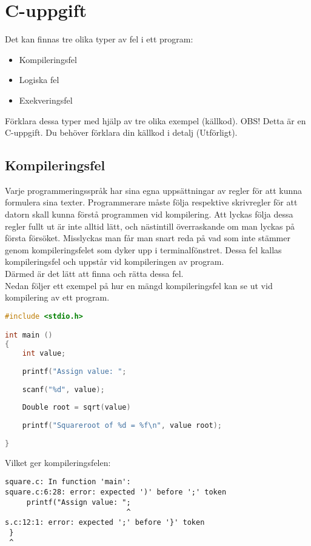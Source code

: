 \documentclass[../main.tex]{subfiles}
\begin{document}
\section{C-uppgift}
\label{sec:top}
Det kan finnas tre olika typer av fel i ett program:

\begin{itemize}
    \item Kompileringsfel
    \item Logiska fel
    \item Exekveringsfel
\end{itemize}

Förklara dessa typer med hjälp av tre olika exempel (källkod).
OBS! Detta är en C-uppgift. Du behöver förklara din källkod i detalj (Utförligt).

\subsection{Kompileringsfel}

Varje programmeringsspråk har sina egna uppsättningar av regler för att kunna formulera sina texter. 
Programmerare måste följa respektive skrivregler för att datorn skall kunna förstå programmen vid kompilering.
Att lyckas följa dessa regler fullt ut är inte alltid lätt, och nästintill överraskande om man lyckas på första försöket. Misslyckas man får man snart reda på vad som inte stämmer genom kompileringsfelet som dyker upp i terminalfönstret. Dessa fel kallas kompileringsfel och uppstår vid kompileringen av program.\\
Därmed är det lätt att finna och rätta dessa fel.\\

Nedan följer ett exempel på hur en mängd kompileringsfel kan se ut vid kompilering av ett program.

\begin{lstlisting}[language=c]
#include <stdio.h> 

int main () 
{
    int value; 
    
    printf("Assign value: "; 
    
    scanf("%d", value); 
    
    Double root = sqrt(value) 
    
    printf("Squareroot of %d = %f\n", value root);
 
}
\end{lstlisting}

\newpage

Vilket ger kompileringsfelen:
\begin{lstlisting}
square.c: In function 'main':
square.c:6:28: error: expected ')' before ';' token
     printf("Assign value: ";
                            ^
s.c:12:1: error: expected ';' before '}' token
 }
 ^
\end{lstlisting}
\end{document}
